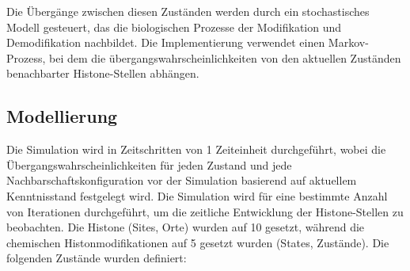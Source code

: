 \documentclass{SeminarV2}
\begin{document}
Die \"{U}berg\"{a}nge zwischen diesen Zust\"{a}nden 
werden durch ein stochastisches Modell gesteuert, das die 
biologischen Prozesse der Modifikation und Demodifikation nachbildet. 
Die Implementierung verwendet einen Markov-Prozess, bei dem die 
\"{u}bergangswahrscheinlichkeiten von den aktuellen Zust\"{a}nden benachbarter Histone-Stellen abh\"{a}ngen.

\subsection{Modellierung}
Die Simulation wird in Zeitschritten von 1 Zeiteinheit durchgef\"{u}hrt, wobei die \"{U}bergangswahrscheinlichkeiten f\"{u}r jeden Zustand und jede Nachbarschaftskonfiguration 
vor der Simulation basierend auf aktuellem Kenntnisstand festgelegt wird.
Die Simulation wird f\"{u}r eine bestimmte Anzahl von Iterationen durchgef\"{u}hrt, um die zeitliche Entwicklung der Histone-Stellen zu beobachten.
Die Histone (Sites, Orte) wurden auf 10 gesetzt, während die chemischen Histonmodifikationen auf 5 gesetzt wurden (States, Zustände).
Die folgenden Zust\"{a}nde wurden definiert:
\end{document}
